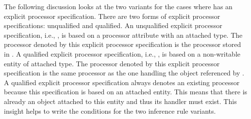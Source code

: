 The following discussion looks at the two variants for the cases where  has an explicit processor specification. There are two forms of explicit processor specifications: unqualified and qualified. An unqualified explicit processor specification, i.e., , is based on a processor attribute  with an attached type. The processor denoted by this explicit processor specification is the processor stored in . A qualified explicit processor specification, i.e., , is based on a non-writable entity  of attached type. The processor denoted by this explicit processor specification is the same processor as the one handling the object referenced by . A qualified explicit processor specification always denotes an existing processor because this specification is based on an attached entity. This means that there is already an object attached to this entity and thus its handler must exist. This insight helps to write the conditions for the two inference rule variants.

